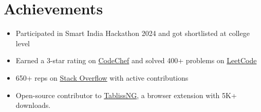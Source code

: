 \documentclass[letterpaper,11pt]{article}
\begin{document}
\section{Achievements}
\begin{itemize}[leftmargin=0.15in, itemsep=-5pt]
     \item \small{Participated in Smart India Hackathon 2024 and got shortlisted at college level}
    \item \small{Earned a 3-star rating on \href{https://www.codechef.com/users/sbrjt}{CodeChef} and solved 400+ problems on \href{https://leetcode.com/u/user1484IW/}{LeetCode}}
    \item \small{650+ reps on \href{https://stackoverflow.com/users/14313852/shub}{Stack Overflow} with active contributions}
     \item \small{Open-source contributor to \href{https://github.com/BookCatKid/TablissNG/issues?q=author:sbrjt%20is:pr}{TablissNG}, a browser extension with 5K+ downloads.}
\end{itemize}


\end{document}
